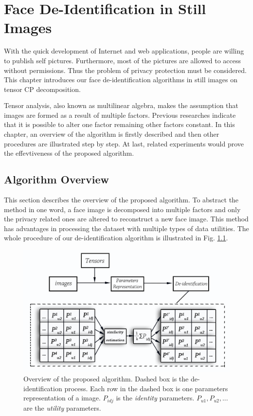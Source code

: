 \chapter{Face De-Identification in Still Images}
\label{chap:FDimages}

With the quick development of Internet and web applications, 
people are willing to publish self pictures. Furthermore, 
most of the pictures are allowed to access without permissions. 
Thus the problem of privacy protection must be considered.
This chapter introduces our face de-identification algorithms 
in still images on tensor CP decomposition. 

Tensor analysis, also known as multilinear algebra, makes 
the assumption that images are formed as a result of multiple 
factors. Previous researches indicate that it is possible to
alter one factor remaining other factors constant\cite{VasilescuT03}. 
In this chapter, an overview of the algorithm is firstly 
described and then other procedures are illustrated step by step. 
At last, related experiments would prove the effevtiveness
of the proposed algorithm.

\section{Algorithm Overview}
This section describes the overview of the proposed algorithm.
To abstract the method in one word, a face image is decomposed
into multiple factors and only the privacy related ones are
altered to reconstruct a new face image. This method has advantages
in processing the dataset with multiple types of data utilities.
The whole procedure of our de-identification algorithm is 
illustrated in Fig. \ref{fig:diagram}. 

\begin{figure}[!htb]
    \centering
    \includegraphics[scale=0.7]{figure/overflow}
    \caption{Overview of the proposed algorithm. Dashed box is the de-identification process. Each row 
    in the dashed box is one parameters representation of a image. $P_{idj}$ is the {\it identity}
    parameters. $P_{u1},P_{u2},...$ are the {\it utility} parameters.}
    \label{fig:diagram}
\end{figure}

